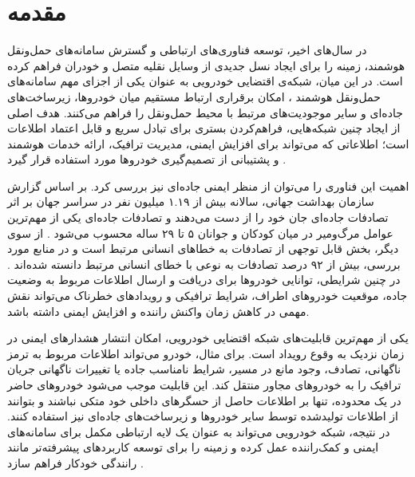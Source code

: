 \documentclass[12pt,a4paper]{article}
\begin{document}
\newpage

\tableofcontents
\newpage

\section{مقدمه}

در سال‌های اخیر، توسعه فناوری‌های ارتباطی و گسترش سامانه‌های حمل‌ونقل هوشمند، زمینه را برای ایجاد نسل جدیدی از وسایل نقلیه متصل و خودران فراهم کرده است. در این میان، شبکه‌ی اقتضایی خودرویی  به عنوان یکی از اجزای مهم سامانه‌های حمل‌ونقل هوشمند ، امکان برقراری ارتباط مستقیم میان خودروها، زیرساخت‌های جاده‌ای و سایر موجودیت‌های مرتبط با محیط حمل‌ونقل را فراهم می‌کنند. هدف اصلی از ایجاد چنین شبکه‌هایی، فراهم‌کردن بستری برای تبادل سریع و قابل اعتماد اطلاعات است؛ اطلاعاتی که می‌تواند برای افزایش ایمنی، مدیریت ترافیک، ارائه خدمات هوشمند و پشتیبانی از تصمیم‌گیری خودروها مورد استفاده قرار گیرد \cite{hozouriOverviewVANETVehicular2023}.

اهمیت این فناوری را می‌توان از منظر ایمنی جاده‌ای نیز بررسی کرد. بر اساس گزارش سازمان بهداشت جهانی، سالانه بیش از ۱.۱۹ میلیون نفر در سراسر جهان بر اثر تصادفات جاده‌ای جان خود را از دست می‌دهند و تصادفات جاده‌ای یکی از مهم‌ترین عوامل مرگ‌ومیر در میان کودکان و جوانان ۵ تا ۲۹ ساله محسوب می‌شود \cite{farsimadanReviewSecurityChallenges2025}. از سوی دیگر، بخش قابل توجهی از تصادفات به خطاهای انسانی مرتبط است و در منابع مورد بررسی، بیش از ۹۲ درصد تصادفات به نوعی با خطای انسانی مرتبط دانسته شده‌اند \cite{hozouriOverviewVANETVehicular2023}. در چنین شرایطی، توانایی خودروها برای دریافت و ارسال اطلاعات مربوط به وضعیت جاده، موقعیت خودروهای اطراف، شرایط ترافیکی و رویدادهای خطرناک می‌تواند نقش مهمی در کاهش زمان واکنش راننده و افزایش ایمنی داشته باشد.

یکی از مهم‌ترین قابلیت‌های شبکه اقتضایی خودرویی، امکان انتشار هشدارهای ایمنی در زمان نزدیک به وقوع رویداد است. برای مثال، خودرو می‌تواند اطلاعات مربوط به ترمز ناگهانی، تصادف، وجود مانع در مسیر، شرایط نامناسب جاده یا تغییرات ناگهانی جریان ترافیک را به خودروهای مجاور منتقل کند. این قابلیت موجب می‌شود خودروهای حاضر در یک محدوده، تنها بر اطلاعات حاصل از حسگرهای داخلی خود متکی نباشند و بتوانند از اطلاعات تولیدشده توسط سایر خودروها و زیرساخت‌های جاده‌ای نیز استفاده کنند. در نتیجه، شبکه خودرویی می‌تواند به عنوان یک لایه ارتباطی مکمل برای سامانه‌های ایمنی و کمک‌راننده عمل کرده و زمینه را برای توسعه کاربردهای پیشرفته‌تر مانند رانندگی خودکار فراهم سازد \cite{hozouriOverviewVANETVehicular2023,xuInternetVehiclesBig2018}.
\end{document}

